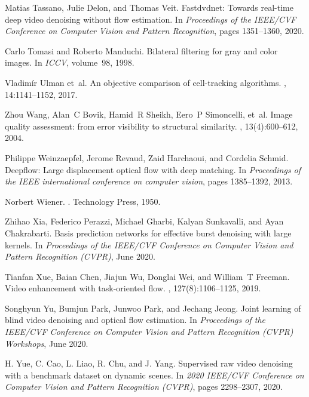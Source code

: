 \documentclass[final]{cvpr}
\begin{document}
{\begin{thebibliography}{10}
Matias Tassano, Julie Delon, and Thomas Veit.
\newblock Fastdvdnet: Towards real-time deep video denoising without flow
  estimation.
\newblock In {\em Proceedings of the IEEE/CVF Conference on Computer Vision and
  Pattern Recognition}, pages 1351--1360, 2020.

Carlo Tomasi and Roberto Manduchi.
\newblock Bilateral filtering for gray and color images.
\newblock In {\em ICCV}, volume~98, 1998.

Vladimír Ulman et~al.
\newblock An objective comparison of cell-tracking algorithms.
, 14:1141--1152, 2017.

Zhou Wang, Alan~C Bovik, Hamid~R Sheikh, Eero~P Simoncelli, et~al.
\newblock Image quality assessment: from error visibility to structural
  similarity.
, 13(4):600--612, 2004.

Philippe Weinzaepfel, Jerome Revaud, Zaid Harchaoui, and Cordelia Schmid.
\newblock Deepflow: Large displacement optical flow with deep matching.
\newblock In {\em Proceedings of the IEEE international conference on computer
  vision}, pages 1385--1392, 2013.

Norbert Wiener.
.
\newblock Technology Press, 1950.

Zhihao Xia, Federico Perazzi, Michael Gharbi, Kalyan Sunkavalli, and Ayan
  Chakrabarti.
\newblock Basis prediction networks for effective burst denoising with large
  kernels.
\newblock In {\em Proceedings of the IEEE/CVF Conference on Computer Vision and
  Pattern Recognition (CVPR)}, June 2020.

Tianfan Xue, Baian Chen, Jiajun Wu, Donglai Wei, and William~T Freeman.
\newblock Video enhancement with task-oriented flow.
,
  127(8):1106--1125, 2019.

Songhyun Yu, Bumjun Park, Junwoo Park, and Jechang Jeong.
\newblock Joint learning of blind video denoising and optical flow estimation.
\newblock In {\em Proceedings of the IEEE/CVF Conference on Computer Vision and
  Pattern Recognition (CVPR) Workshops}, June 2020.

H. {Yue}, C. {Cao}, L. {Liao}, R. {Chu}, and J. {Yang}.
\newblock Supervised raw video denoising with a benchmark dataset on dynamic
  scenes.
\newblock In {\em 2020 IEEE/CVF Conference on Computer Vision and Pattern
  Recognition (CVPR)}, pages 2298--2307, 2020.


\end{thebibliography}}
\end{document}
